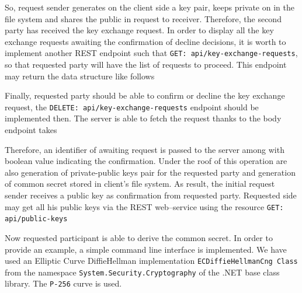 \documentclass[12pt,letterpaper,oneside,reqno]{amsart}
\numberwithin{equation}{section}
\begin{document}
    

    So, request sender generates on the client side a key pair, keeps private on in the file system and shares the public
    in request to receiver.
    Therefore, the second party has received the key exchange request.
    In order to display all the key exchange requests awaiting the confirmation of decline decisions, it is worth to implement
    another REST endpoint such that \texttt{GET: api/key-exchange-requests}, so that requested party will have the list of
    requests to proceed.
    This endpoint may return the data structure like follows

    

    Finally, requested party should be able to confirm or decline the key exchange request, the
    \texttt{DELETE: api/key-exchange-requests} endpoint should be implemented then.
    The server is able to fetch the request thanks to the body endpoint takes

    

    Therefore, an identifier of awaiting request is passed to the server among with boolean value
    indicating the confirmation.
    Under the roof of this operation are also generation of private-public keys pair for the requested party and
    generation of common secret stored in client's file system.
    As result, the initial request sender receives a public key as confirmation from requested party.
    Requested side may get all his public keys via the REST web--service using the resource \texttt{GET: api/public-keys}

    

    Now requested participant is able to derive the common secret.
    In order to provide an example, a simple command line interface is implemented.
    We have used an Elliptic Curve Diffie\textendash Hellman implementation \texttt{ECDiffieHellmanCng Class} from the namespace
    \texttt{System.Security.Cryptography} of the .NET base class library.
    The \texttt{P-256} curve is used.
\end{document}

